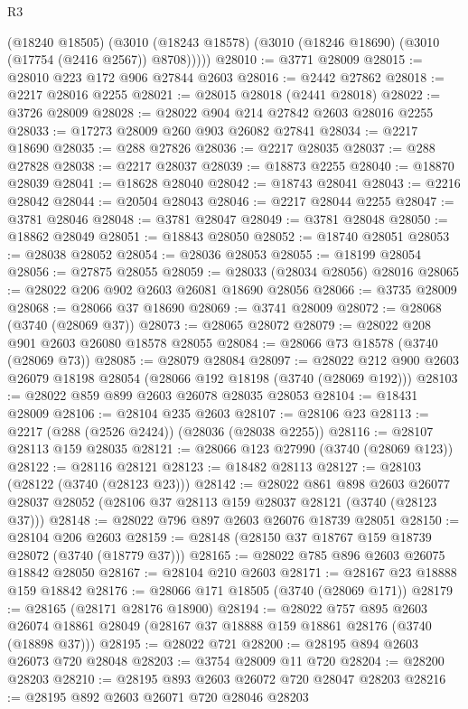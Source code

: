 \begin{lexlean}{R3}
\begin{coremodule}
        (@18240 @18505)
        (@3010 (@18243 @18578) (@3010 (@18246 @18690) (@3010 (@17754 (@2416 @2567)) @8708)))))
@28010 := @3771 @28009
@28015 := @28010 @223 @172 @906 @27844 @2603
@28016 := @2442 @27862
@28018 := @2217 @28016 @2255
@28021 := @28015 @28018 (@2441 @28018)
@28022 := @3726 @28009
@28028 := @28022 @904 @214 @27842 @2603 @28016 @2255
@28033 := @17273 @28009 @260 @903 @26082 @27841
@28034 := @2217 @18690
@28035 := @288 @27826
@28036 := @2217 @28035
@28037 := @288 @27828
@28038 := @2217 @28037
@28039 := @18873 @2255
@28040 := @18870 @28039
@28041 := @18628 @28040
@28042 := @18743 @28041
@28043 := @2216 @28042
@28044 := @20504 @28043
@28046 := @2217 @28044 @2255
@28047 := @3781 @28046
@28048 := @3781 @28047
@28049 := @3781 @28048
@28050 := @18862 @28049
@28051 := @18843 @28050
@28052 := @18740 @28051
@28053 := @28038 @28052
@28054 := @28036 @28053
@28055 := @18199 @28054
@28056 := @27875 @28055
@28059 := @28033 (@28034 @28056) @28016
@28065 := @28022 @206 @902 @2603 @26081 @18690 @28056
@28066 := @3735 @28009
@28068 := @28066 @37 @18690
@28069 := @3741 @28009
@28072 := @28068 (@3740 (@28069 @37))
@28073 := @28065 @28072
@28079 := @28022 @208 @901 @2603 @26080 @18578 @28055
@28084 := @28066 @73 @18578 (@3740 (@28069 @73))
@28085 := @28079 @28084
@28097 := @28022 @212 @900 @2603 @26079 @18198 @28054 (@28066 @192 @18198 (@3740 (@28069 @192)))
@28103 := @28022 @859 @899 @2603 @26078 @28035 @28053
@28104 := @18431 @28009
@28106 := @28104 @235 @2603
@28107 := @28106 @23
@28113 := @2217 (@288 (@2526 @2424)) (@28036 (@28038 @2255))
@28116 := @28107 @28113 @159 @28035
@28121 := @28066 @123 @27990 (@3740 (@28069 @123))
@28122 := @28116 @28121
@28123 := @18482 @28113
@28127 := @28103 (@28122 (@3740 (@28123 @23)))
@28142 := @28022
    @861
    @898
    @2603
    @26077
    @28037
    @28052
    (@28106 @37 @28113 @159 @28037 @28121 (@3740 (@28123 @37)))
@28148 := @28022 @796 @897 @2603 @26076 @18739 @28051
@28150 := @28104 @206 @2603
@28159 := @28148 (@28150 @37 @18767 @159 @18739 @28072 (@3740 (@18779 @37)))
@28165 := @28022 @785 @896 @2603 @26075 @18842 @28050
@28167 := @28104 @210 @2603
@28171 := @28167 @23 @18888 @159 @18842
@28176 := @28066 @171 @18505 (@3740 (@28069 @171))
@28179 := @28165 (@28171 @28176 @18900)
@28194 := @28022
    @757
    @895
    @2603
    @26074
    @18861
    @28049
    (@28167 @37 @18888 @159 @18861 @28176 (@3740 (@18898 @37)))
@28195 := @28022 @721
@28200 := @28195 @894 @2603 @26073 @720 @28048
@28203 := @3754 @28009 @11 @720
@28204 := @28200 @28203
@28210 := @28195 @893 @2603 @26072 @720 @28047 @28203
@28216 := @28195 @892 @2603 @26071 @720 @28046 @28203

\end{coremodule}
\end{lexlean}
